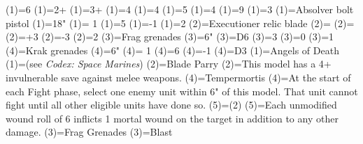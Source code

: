 \renewcommand{\UnitName}{Judicar }%
\renewcommand{\UnitPower}{4}%
\renewcommand{\UnitIcon}{Elites.svg}%
%
\renewcommand{\StatBlocks}{1}%
\Movement(1)={6}%
\WeaponSkill(1)={2+}%
\BalisticSkill(1)={3+}%
\Strength(1)={4}%
\Toughness(1)={4}%
\Wounds(1)={5}%
\Attacks(1)={4}%
\Leadership(1)={9}%
\Save(1)={3}%
%
\renewcommand{\UnitText}{1 \UnitName with: \WeaponName(1); \WeaponName(2); \WeaponName(3); \WeaponName(4).}%
%
%
\renewcommand{\NumWeapon}{4}%
\WeaponName(1)={Absolver bolt pistol}%
\WeaponRange(1)={18"}%
\WeaponType(1)={ 1}%
\WeaponStrength(1)={5}%
\WeaponAP(1)={-1}%
\WeaponDamage(1)={2}%
%
\WeaponName(2)={Executioner relic blade}%
\WeaponRange(2)={}%
\WeaponType(2)={}%
\WeaponStrength(2)={+3}%
\WeaponAP(2)={-3}%
\WeaponDamage(2)={2}%
%
\WeaponName(3)={Frag grenades}%
\WeaponRange(3)={6"}%
\WeaponType(3)={D6}%
\WeaponStrength(3)={3}%
\WeaponAP(3)={0}%
\WeaponDamage(3)={1}%
%
\WeaponName(4)={Krak grenades}%
\WeaponRange(4)={6"}%
\WeaponType(4)={ 1}%
\WeaponStrength(4)={6}%
\WeaponAP(4)={-1}%
\WeaponDamage(4)={D3}%
%
\renewcommand{\NumAbilities}{3}%
\AbilityName(1)={Angels of Death}%
\AbilityDescription(1)={(see \textit{Codex: Space Marines})}%
%
\AbilityName(2)={Blade Parry}%
\AbilityDescription(2)={This model has a 4+ invulnerable save against melee weapons.}%
%
\AbilityName(4)={Tempermortis}%
\AbilityDescription(4)={At the start of each Fight phase, select one enemy unit within 6" of this model.  That unit cannot fight until all other eligible units have done so.}%
%
\AbilityName(5)={\WeaponName(2)}%
\AbilityDescription(5)={Each unmodified wound roll of 6 inflicts 1 mortal wound on the target in addition to any other damage.}%
%
\AbilityName(3)={Frag Grenades}%
\AbilityDescription(3)={Blast}%
%
\renewcommand{\FactionKeywords}{Imperium, Adeptus Astartes, <Chapter>}%
\renewcommand{\Keywords}{Infantry, Character, Primaris, \UnitName}%
%
\newcommand{\ExtraFrontTitle}{\AbilityName(4)}%
\renewcommand{\ExtraFrontText}{\AbilityDescription(4)}%
\newcommand{\ExtraBackTitle}{\AbilityName(5)}%
\renewcommand{\ExtraBackText}{\AbilityDescription(5)}%
%
\endinput%